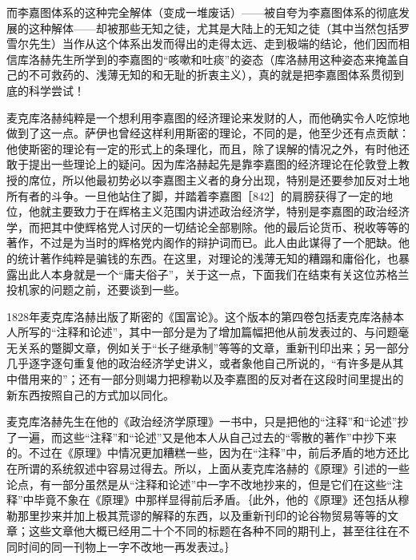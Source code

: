 而李嘉图体系的这种完全解体（变成一堆废话）——被自夸为李嘉图体系的彻底发展的这种解体——却被那些无知之徒，尤其是大陆上的无知之徒（其中当然包括罗雪尔先生）当作从这个体系出发而得出的走得太远、走到极端的结论，他们因而相信库洛赫先生所学到的李嘉图的“咳嗽和吐痰”的姿态（库洛赫用这种姿态来掩盖自己的不可救药的、浅薄无知的和无耻的折衷主义），真的就是把李嘉图体系贯彻到底的科学尝试！

麦克库洛赫纯粹是一个想利用李嘉图的经济理论来发财的人，而他确实令人吃惊地做到了这一点。萨伊也曾经这样利用斯密的理论，不同的是，他至少还有点贡献：他使斯密的理论有一定的形式上的条理化，而且，除了误解的情况之外，有时他还敢于提出一些理论上的疑问。因为库洛赫起先是靠李嘉图的经济理论在伦敦登上教授的席位，所以他最初势必以李嘉图主义者的身分出现，特别是还要参加反对土地所有者的斗争。一旦他站住了脚，并踏着李嘉图［842］的肩膀获得了一定的地位，他就主要致力于在辉格主义范围内讲述政治经济学，特别是李嘉图的政治经济学，而把其中使辉格党人讨厌的一切结论全部剔除。他的最后论货币、税收等等的著作，不过是为当时的辉格党内阁作的辩护词而已。此人由此谋得了一个肥缺。他的统计著作纯粹是骗钱的东西。在这里，对理论的浅薄无知的糟蹋和庸俗化，也暴露出此人本身就是一个“庸夫俗子”，关于这一点，下面我们在结束有关这位苏格兰投机家的问题之前，还要谈到一些。

1828年麦克库洛赫出版了斯密的《国富论》。这个版本的第四卷包括麦克库洛赫本人所写的“注释和论述”，其中一部分是为了增加篇幅把他从前发表过的、与问题毫无关系的蹩脚文章，例如关于“长子继承制”等等的文章，重新刊印出来；另一部分几乎逐字逐句重复他的政治经济学史讲义，或者象他自己所说的，“有许多是从其中借用来的”；还有一部分则竭力把穆勒以及李嘉图的反对者在这段时间里提出的新东西按照自己的方式加以同化。

麦克库洛赫先生在他的《政治经济学原理》一书中，只是把他的“注释”和“论述”抄了一遍，而这些“注释”和“论述”又是他本人从自己过去的“零散的著作”中抄下来的。不过在《原理》中情况更加糟糕一些，因为在“注释”中，前后矛盾的地方还比在所谓的系统叙述中容易过得去。所以，上面从麦克库洛赫的《原理》引述的一些论点，有一部分虽然是从“注释和论述”中一字不改地抄来的，但是它们在这些“注释”中毕竟不象在《原理》中那样显得前后矛盾。｛此外，他的《原理》还包括从穆勒那里抄来并加上极其荒谬的解释的东西，以及重新刊印的论谷物贸易等等的文章；这些文章他大概已经用二十个不同的标题在各种不同的期刊上，甚至往往在不同时间的同一刊物上一字不改地一再发表过。｝

